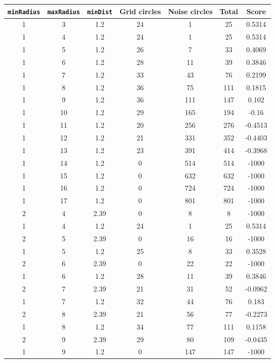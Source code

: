 \documentclass[letterpaper, 12pt]{article}
\begin{document}
\begin{longtable}{|c|c|c|c|c|c|c|}
\hline
\textbf{\texttt{minRadius}} & \textbf{\texttt{maxRadius}} & \textbf{\texttt{minDist}} & \textbf{Grid circles} & \textbf{Noise circles} & \textbf{Total} & \textbf{Score} \\
\hline
1 & 3 & 1.2 & 24 & 1 & 25 & 0.5314 \\
\hline
1 & 4 & 1.2 & 24 & 1 & 25 & 0.5314 \\
\hline
1 & 5 & 1.2 & 26 & 7 & 33 & 0.4069 \\
\hline
1 & 6 & 1.2 & 28 & 11 & 39 & 0.3846 \\
\hline
1 & 7 & 1.2 & 33 & 43 & 76 & 0.2199 \\
\hline
1 & 8 & 1.2 & 36 & 75 & 111 & 0.1815 \\
\hline
1 & 9 & 1.2 & 36 & 111 & 147 & 0.102 \\
\hline
1 & 10 & 1.2 & 29 & 165 & 194 & -0.16 \\
\hline
1 & 11 & 1.2 & 20 & 256 & 276 & -0.4513 \\
\hline
1 & 12 & 1.2 & 21 & 331 & 352 & -0.4403 \\
\hline
1 & 13 & 1.2 & 23 & 391 & 414 & -0.3968 \\
\hline
1 & 14 & 1.2 & 0 & 514 & 514 & -1000 \\
\hline
1 & 15 & 1.2 & 0 & 632 & 632 & -1000 \\
\hline
1 & 16 & 1.2 & 0 & 724 & 724 & -1000 \\
\hline
1 & 17 & 1.2 & 0 & 801 & 801 & -1000 \\
\hline
2 & 4 & 2.39 & 0 & 8 & 8 & -1000 \\
\hline
1 & 4 & 1.2 & 24 & 1 & 25 & 0.5314 \\
\hline
2 & 5 & 2.39 & 0 & 16 & 16 & -1000 \\
\hline
1 & 5 & 1.2 & 25 & 8 & 33 & 0.3528 \\
\hline
2 & 6 & 2.39 & 0 & 22 & 22 & -1000 \\
\hline
1 & 6 & 1.2 & 28 & 11 & 39 & 0.3846 \\
\hline
2 & 7 & 2.39 & 21 & 31 & 52 & -0.0962 \\
\hline
1 & 7 & 1.2 & 32 & 44 & 76 & 0.183 \\
\hline
2 & 8 & 2.39 & 21 & 56 & 77 & -0.2273 \\
\hline
1 & 8 & 1.2 & 34 & 77 & 111 & 0.1158 \\
\hline
2 & 9 & 2.39 & 29 & 80 & 109 & -0.0435 \\
\hline
1 & 9 & 1.2 & 0 & 147 & 147 & -1000 \\

\end{longtable}
\end{document}
